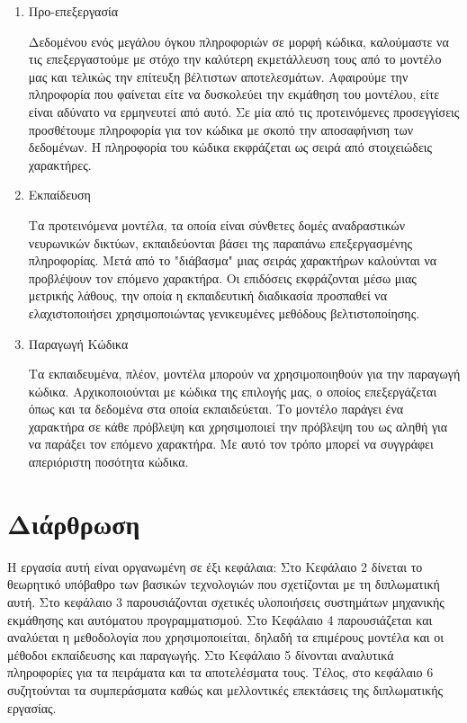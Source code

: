 \begin{enumerate}
\item Προ-επεξεργασία 

Δεδομένου ενός μεγάλου όγκου πληροφοριών σε μορφή κώδικα, καλούμαστε να τις επεξεργαστούμε με στόχο την καλύτερη εκμετάλλευση τους από το μοντέλο μας και τελικώς την επίτευξη βέλτιστων αποτελεσμάτων.
Αφαιρούμε την πληροφορία που φαίνεται είτε να δυσκολεύει την εκμάθηση του μοντέλου, είτε είναι αδύνατο να ερμηνευτεί από αυτό.
Σε μία από τις προτεινόμενες προσεγγίσεις προσθέτουμε πληροφορία για τον κώδικα με σκοπό την αποσαφήνιση των δεδομένων.
Η πληροφορία του κώδικα εκφράζεται ως σειρά από στοιχειώδεις χαρακτήρες.

\item Εκπαίδευση 

Τα προτεινόμενα μοντέλα, τα οποία είναι σύνθετες δομές αναδραστικών νευρωνικών δικτύων, εκπαιδεύονται βάσει της παραπάνω επεξεργασμένης πληροφορίας.
Μετά από το "διάβασμα" μιας σειράς χαρακτήρων καλούνται να προβλέψουν τον επόμενο χαρακτήρα. Οι επιδόσεις εκφράζονται μέσω μιας μετρικής λάθους, την οποία η εκπαιδευτική διαδικασία προσπαθεί να ελαχιστοποιήσει χρησιμοποιώντας γενικευμένες μεθόδους βελτιστοποίησης.  


\item Παραγωγή Κώδικα 

Τα εκπαιδευμένα, πλέον, μοντέλα μπορούν να χρησιμοποιηθούν για την παραγωγή κώδικα.
Αρχικοποιούνται με κώδικα της επιλογής μας, ο οποίος επεξεργάζεται όπως και τα δεδομένα στα οποία εκπαιδεύεται.
Το μοντέλο παράγει ένα χαρακτήρα σε κάθε πρόβλεψη και χρησιμοποιεί την πρόβλεψη του ως αληθή για να παράξει τον επόμενο χαρακτήρα.
Με αυτό τον τρόπο μπορεί να συγγράφει απεριόριστη ποσότητα κώδικα.
\end{enumerate}

\section{Διάρθρωση}
Η εργασία αυτή είναι οργανωμένη σε έξι κεφάλαια: Στο Κεφάλαιο 2 δίνεται το θεωρητικό υπόβαθρο των βασικών τεχνολογιών που σχετίζονται με τη διπλωματική αυτή.
Στο κεφάλαιο 3 παρουσιάζονται σχετικές υλοποιήσεις συστημάτων μηχανικής εκμάθησης και αυτόματου προγραμματισμού.
Στο Κεφάλαιο 4 παρουσιάζεται και αναλύεται η μεθοδολογία που χρησιμοποιείται, δηλαδή τα επιμέρους μοντέλα και οι μέθοδοι εκπαίδευσης και παραγωγής. Στο Κεφάλαιο 5 δίνονται αναλυτικά πληροφορίες για τα πειράματα και τα αποτελέσματα τους.
Τέλος, στο κεφάλαιο 6 συζητούνται τα συμπεράσματα καθώς και μελλοντικές επεκτάσεις της διπλωματικής εργασίας.